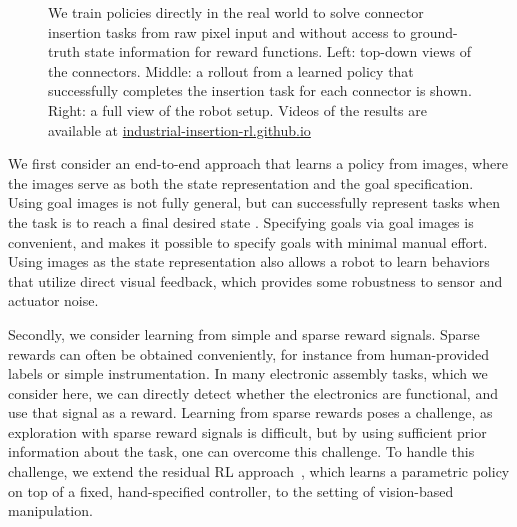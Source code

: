 \begin{figure}[t]
\begin{subfigure}{0.69\linewidth}
\begin{subfigure}[b]{0.29\linewidth}
            \centering
        \end{subfigure}\hfill
    \end{subfigure}

\caption{We train policies directly in the real world to solve connector insertion tasks from raw pixel input and without access to ground-truth state information for reward functions. Left: top-down views of the connectors. Middle: a rollout from a learned policy that successfully completes the insertion task for each connector is shown. Right: a full view of the robot setup. Videos of the results are available at \href{https://industrial-insertion-rl.github.io/}{industrial-insertion-rl.github.io} }
    \label{fig:usb_photo_demo2}
\end{figure}

We first consider an end-to-end approach that learns a policy from images, where the images serve as both the state representation and the goal specification. Using goal images is not fully general, but can successfully represent tasks when the task is to reach a final desired state \citep{nair2018rig}.
Specifying goals via goal images is convenient, and makes it possible to specify goals with minimal manual effort. Using images as the state representation also allows a robot to learn behaviors that utilize direct visual feedback, which provides some robustness to sensor and actuator noise.

Secondly, we consider learning from simple and sparse reward signals. Sparse rewards can often be obtained conveniently, for instance from human-provided labels or simple instrumentation. In many electronic assembly tasks, which we consider here, we can directly detect whether the electronics are functional, and use that signal as a reward. Learning from sparse rewards poses a challenge, as exploration with sparse reward signals is difficult, but by using sufficient prior information about the task, one can overcome this challenge. To handle this challenge, we extend the residual RL approach~\cite{johannink18residualrl, silver18residualpolicylearning}, which learns a parametric policy on top of a fixed, hand-specified controller, to the setting of vision-based manipulation.

    
